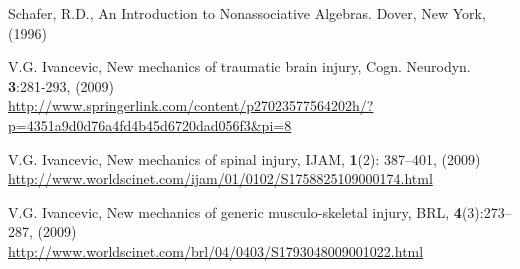 \documentclass[11pt,fontset=founder]{ctexart}
\begin{document}
\begin{thebibliography}{99}
 Schafer, R.D., An Introduction to Nonassociative Algebras.
Dover, New York, (1996)

 V.G. Ivancevic, New mechanics of traumatic brain injury,
Cogn. Neurodyn. \textbf{3}:281-293, (2009)\\
\underline{http://www.springerlink.com/content/p27023577564202h/?p=4351a9d0d76a4fd4b45d6720dad056f3\&pi=8}

 V.G. Ivancevic, New mechanics of spinal injury, IJAM,
\textbf{1}(2): 387--401, (2009)\\
\underline{http://www.worldscinet.com/ijam/01/0102/S1758825109000174.html}

 V.G. Ivancevic, New mechanics of generic musculo-skeletal
injury, BRL, \textbf{4}(3):273--287, (2009)\\
\underline{http://www.worldscinet.com/brl/04/0403/S1793048009001022.html}
\end{thebibliography}
\end{document}
